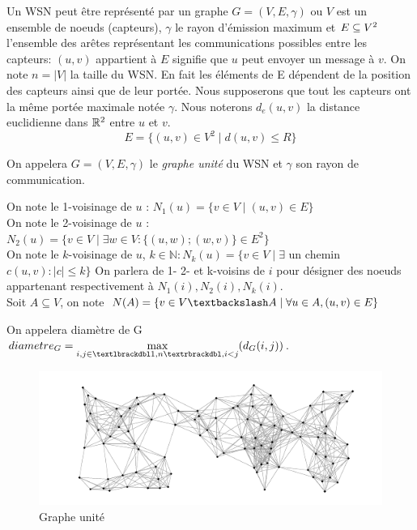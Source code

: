   Un WSN peut être représenté par un graphe $G= (V,E,\gamma)$ ou $V$ est un ensemble de noeuds (capteurs), $\gamma$ le rayon d'émission maximum et $E \subseteq V \textsuperscript{2}$ l'ensemble des arêtes représentant les communications possibles entre les capteurs: $(u,v)$ appartient à $E$ signifie que $u$ peut envoyer un  message à $v$. On note $ n=|V| $ la taille du WSN. En fait les éléments de E dépendent de la position des capteurs ainsi que de leur portée. Nous supposerons que tout les capteurs ont la même portée maximale notée $\gamma$. Nous noterons $d_e(u,v)$ la distance euclidienne dans $\mathbb{R} \textsuperscript{2}$ entre $u$ et $v$.
$$E = \{ (u,v) \in V ^{2} \mid d(u,v) \leq R \}$$

\begin{mydef}
 On appelera $G= (V,E,\gamma)$ le \textit{graphe unité} du WSN et $\gamma$ son rayon de communication.
\end{mydef}

\begin{mydef}
On note le 1-voisinage de $u$ : $N_1(u) = \{ v \in V  \mid (u,v) \in E \}$ \\
On note le 2-voisinage de $u$ : $N_2(u) = \{ v \in V \mid  \exists w \in V :\{(u,w);(w,v)\} \in E ^2\}$ \\
On note le $k$-voisinage de $u$, $k \in \mathbb{N} : N_k(u) = \{ v \in V  \mid \exists $ un chemin $c (u,v): |c| \leq k\}$  On parlera de 1- 2- et k-voisins de $i$ pour désigner des noeuds appartenant respectivement à $N_1(i), N_2(i),N_k(i)$. \\
Soit $A \subseteq V$, on note $N(A) = \{ v \in V\textbackslash  A \mid \forall u\in A,(u,v) \in E \}$ \\
\end{mydef}

\begin{mydef}
 On appelera diamètre de G $diametre_G= \max\limits_{i,j\in \textlbrackdbl 1,n \textrbrackdbl,i<j} (d_G(i,j))$.
\end{mydef}
 
\begin{figure}[H]
\centering
\includegraphics[scale=0.5]{Etat_de_l'art/source/graph1.png}
\caption{Graphe unité}
\end{figure} 


